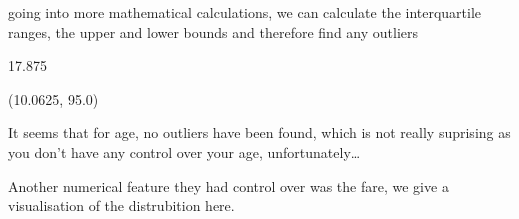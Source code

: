 \documentclass[letterpaper,10pt,english]{jupyterBook}
\begin{document}
\noindent{}

\sphinxAtStartPar
going into more mathematical calculations, we can calculate the interquartile ranges, the upper and lower bounds and therefore find any outliers

\begin{sphinxVerbatim}[commandchars=\\\{\}]
   \PYG{p}{[}\PYG{p}{]}\PYG{p}{[} \PYG{p}{]}
\end{sphinxVerbatim}

\begin{sphinxVerbatim}[commandchars=\\\{\}]
17.875
\end{sphinxVerbatim}

\begin{sphinxVerbatim}[commandchars=\\\{\}]
      
      
 
\end{sphinxVerbatim}

\begin{sphinxVerbatim}[commandchars=\\\{\}]
(\PYGZhy{}10.0625, 95.0)
\end{sphinxVerbatim}

\sphinxAtStartPar
It seems that for age, no outliers have been found, which is not really suprising as you don’t have any control over your age, unfortunately…

\sphinxAtStartPar
Another numerical feature they had control over was the fare, we give a visualisation of the distrubition here.

\begin{sphinxVerbatim}[commandchars=\\\{\}]
\PYG{p}{[}\PYG{p}{]}
\end{sphinxVerbatim}
\end{document}
